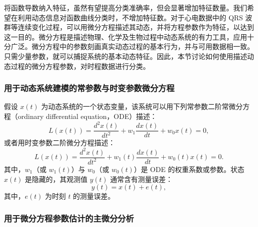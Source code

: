 将函数导数纳入特征，虽然有望提高分类准确率，但会显著增加特征数量。我们希望在利用动态信息对函数曲线分类时，不增加特征数。对于心电数据中的 QRS 波群等连续变化过程，可以用微分方程描述其动态，并将方程参数作为特征，以达到这一目的。微分方程是描述物理、化学及生物过程中动态系统的有力工具，应用十分广泛。微分方程中的参数刻画真实动态过程的基本行为，并与可用数据相一致。只需少量参数，就可以捕捉系统的基本动态特征。因此，本节讨论如何使用描述动态过程的微分方程参数，对时程数据进行分类。

\subsubsection{用于动态系统建模的常参数与时变参数微分方程}

假设 $x(t)$ 为动态系统的一个状态变量，该系统可以用下列常参数二阶常微分方程（ordinary differential equation，ODE）描述：
\begin{equation}
L(x(t))=\frac{d^2x(t)}{dt^2}
 +w_1\frac{dx(t)}{dt}+w_0x(t)=0,
\tag{3.3}
\end{equation}
或者用时变参数二阶微分方程描述：
\begin{equation}
L(x(t))=\frac{d^2x(t)}{dt^2}
 +w_1(t)\frac{dx(t)}{dt}+w_0(t)x(t)=0.
\tag{3.4}
\end{equation}
其中，$w_1$（或 $w_1(t)$）与 $w_0$（或 $w_0(t)$）是 ODE 的权重系数或参数。状态 $x(t)$ 是隐藏的，其观测值 $y(t)$ 通常含有测量误差：
\begin{equation}
y(t)=x(t)+e(t),
\tag{3.5}
\end{equation}
其中，$e(t)$ 为时刻 $t$ 的测量误差。

\subsubsection{用于微分方程参数估计的主微分分析}

